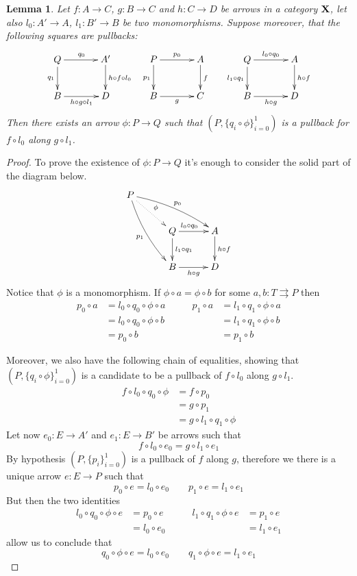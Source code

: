 \documentclass[a4paper,twoside]{report}
\def\X{\textbf {\textup{X}}}
\newtheorem{lemma}[theorem]{Lemma}
\theoremstyle{definition}
\begin{document}
	
	\begin{lemma}\label{lem:cond} Let $f\colon A\to C$, $g\colon B\to C$ and $h\colon C\to D$ be arrows in a category $\X$, let also $l_0\colon A'\to A$, $l_1\colon B'\to B$ be two monomorphisms. Suppose moreover, that the following squares are pullbacks:
		\[\xymatrix@C=35pt{Q \ar[r]^{q_0} \ar[d]_{q_1} & A' \ar[d]^{h\circ f\circ l_0} & P \ar[r]^{p_0} \ar[d]_{p_1} & A \ar[d]^{f} & Q  \ar[r]^{l_0\circ q_0} \ar[d]_{l_1\circ q_1}& A \ar[d]^{h\circ f}\\ B \ar[r]_{h\circ g\circ l_1} &D& B \ar[r]_{g}& C &  B \ar[r]_{h\circ g} & D}\]
		Then there exists an arrow $\phi\colon P\to Q$ such that $(P, \{q_i\circ \phi\}_{i=0}^1)$ is a pullback for $f\circ l_0$ along $g\circ l_1$.
	\end{lemma} 
	\begin{proof}
To prove the existence of $\phi\colon P\to Q$ it's enough to consider the solid part of the diagram below.
\[\xymatrix@C=30pt{P \ar@{.>}[dr]^{\phi} \ar@/^.2cm/[drr]^{p_0} \ar@/_.2cm/[ddr]_{p_1}\\ & Q  \ar[r]^(.4){l_0\circ q_0} \ar[d]^{l_1\circ q_1}& A \ar[d]^{h\circ f} \\ &B \ar[r]_{h\circ g} & D}\]
Notice that $\phi$ is a monomorphism. If $\phi\circ a=\phi \circ b$ for some $a,b\colon T\rightrightarrows P$ then
\[\begin{split}
	p_0\circ a&=l_0\circ q_0\circ \phi \circ a\\&=l_0\circ q_0\circ \phi \circ b\\&=p_0\circ b
\end{split} \qquad \begin{split}
p_1\circ a&=l_1\circ q_1\circ \phi \circ a\\&=l_1\circ q_1\circ \phi \circ b\\&=p_1\circ b
\end{split} \]

Moreover, we also have the following chain of equalities, showing that  $(P, \{q_i\circ \phi\}_{i=0}^1)$  is a candidate to be a pullback of $f\circ l_0$ along $g\circ l_1$.
\begin{align*}
f\circ l_0\circ q_0\circ \phi &=f\circ p_0\\&=g\circ p_1\\&=g\circ l_1\circ q_1\circ \phi 
\end{align*}
Let now $e_0\colon E\to A'$ and $e_1\colon E\to B'$ be arrows such that 
\[f\circ l_0\circ e_0=g\circ l_1\circ e_1\]
By hypothesis $(P, \{p_i\}_{i=0}^1)$ is a pullback of $f$ along $g$, therefore we there is a unique  arrow $e\colon E\to P$ such that
\[p_0\circ e = l_0\circ e_0 \qquad p_1\circ e=l_1\circ e_1\]
But then the two identities
\[\begin{split}
	l_0\circ q_0\circ \phi\circ e&=p_0\circ e\\& =l_0\circ e_0 \end{split} \qquad \begin{split}l_1\circ q_1\circ \phi\circ e&=p_1\circ e\\& =l_1\circ e_1
\end{split}\]
allow us to conclude that 
\[q_0\circ \phi\circ e=l_0\circ e_0 \qquad q_1\circ \phi\circ e=l_1\circ e_1\]
	

\end{proof}
\end{document}
